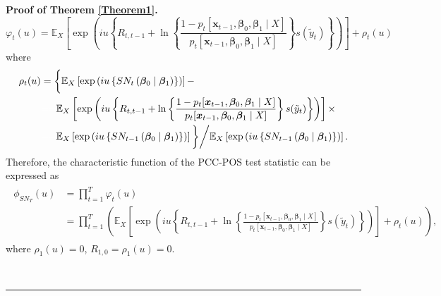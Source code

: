 \documentclass[harvard,11pt]{article}
\newcommand{\E}{\mathbb{E}}
\newenvironment{proof}[1][Proof]{\textbf{#1.} }{\  \rule{0.5em}{0.5em}}
\begin{document}
\begin{proof}[Proof of Theorem \protect\ref{Theorem1}]
\[
\varphi_t(u)=\E_X\left[\exp\left(iu\left\{R_{t,t-1}+\ln\left\{\frac{1-p_t[\bm{x}_{t-1},\bm{\beta}_0,\bm{\beta}_1\mid X]}{p_t[\bm{x}_{t-1},\bm{\beta}_0,\bm{\beta}_1\mid X]}\right\}s(\tilde{y}_t)\right\}\right)\right]+\rho_t(u)
\]
where 
\begingroup
\allowdisplaybreaks
\begin{align*}
\rho_t(u)&=\bigg\{\E_X\left[\exp\left(iu\left\{SN_t\left(\bm{\beta}_0\mid\bm{\beta}_1\right)\right\}\right)\right]-\\
&\textcolor{white}{=}\textcolor{white}{=}\E_X\left[\exp\left(iu\left\{R_{t,t-1}+\ln\left\{\frac{1-p_t[\bm{x}_{t-1},\bm{\beta}_0,\bm{\beta}_1\mid X]}{p_t[\bm{x}_{t-1},\bm{\beta}_0,\bm{\beta}_1\mid X]}\right\}s(\tilde{y}_t)\right\}\right)\right]\times\\
&\textcolor{white}{=}\textcolor{white}{=}\E_X\left[\exp\left(iu\left\{SN_{t-1}\left(\bm{\beta}_0\mid\bm{\beta}_1\right)\right\}\right)\right]\bigg\}\bigg/ \E_X\left[\exp\left(iu\left\{SN_{t-1}\left(\bm{\beta}_0\mid\bm{\beta}_1\right)\right\}\right)\right].
\end{align*}
\endgroup
Therefore, the characteristic function of the PCC-POS test statistic can be expressed as 
\begingroup
\allowdisplaybreaks
\begin{align}
\begin{split}\label{eq: Fourier-inverse}
\phi_{SN_T}(u)&=\prod\limits_{t=1}^{T}\varphi_t(u)\\
&=\prod\limits_{t=1}^{T}\left(\E_X\left[\exp\left(iu\left\{R_{t,t-1}+\ln\left\{\frac{1-p_t[\bm{x}_{t-1},\bm{\beta}_0,\bm{\beta}_1\mid X]}{p_t[\bm{x}_{t-1},\bm{\beta}_0,\bm{\beta}_1\mid X]}\right\}s(\tilde{y}_t)\right\}\right)\right]+\rho_t(u)\right),
\end{split}
\end{align}
\endgroup
where $\rho_1(u)=0$, $R_{1,0}=\rho_1(u)=0$. 


\end{proof}
\end{document}
